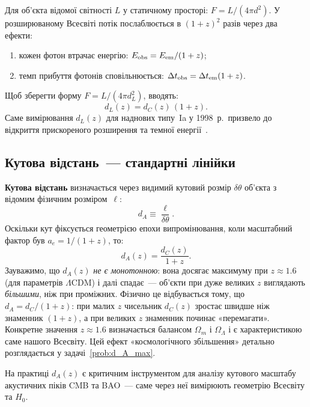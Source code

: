 Для об'єкта відомої світності $L$ у статичному просторі:
$F = L/(4\pi d^2)$. У розширюваному Всесвіті потік послаблюється
в $(1+z)^2$ разів через два ефекти:
\begin{enumerate}
  \item кожен фотон втрачає енергію: $E_{\rm obs} = E_{\rm em}/(1+z)$;
  \item темп прибуття фотонів сповільнюється: $\Delta t_{\rm obs}
        = \Delta t_{\rm em}(1+z)$.
\end{enumerate}
Щоб зберегти форму $F = L/(4\pi d_L^2)$, вводять:
\begin{equation}\label{eq:d_L}
  d_L(z) = d_C(z)\,(1+z).
\end{equation}
Саме вимірювання $d_L(z)$ для наднових типу~Ia у 1998~р.\ призвело
до відкриття прискореного розширення та темної
енергії~\cite{Perlmutter1999,Riess1998}.

\subsection*{Кутова відстань~--- стандартні лінійки}

\textbf{Кутова відстань} визначається через видимий кутовий розмір
$\delta\theta$ об'єкта з відомим фізичним розміром~$\ell$:
\begin{equation}\label{eq:d_A_def}
  d_A \equiv \frac{\ell}{\delta\theta}.
\end{equation}
Оскільки кут фіксується геометрією епохи випромінювання, коли
масштабний фактор був $a_e = 1/(1+z)$, то:
\begin{equation}\label{eq:d_A}
  d_A(z) = \frac{d_C(z)}{1+z}.
\end{equation}
Зауважимо, що $d_A(z)$ \emph{не є монотонною}: вона досягає
максимуму при $z \approx 1.6$ (для параметрів $\Lambda$CDM) і
далі спадає~--- об'єкти при дуже великих $z$ виглядають
\emph{більшими}, ніж при проміжних. Фізично це відбувається тому,
що $d_A = d_C/(1+z)$: при малих $z$ чисельник $d_C(z)$ зростає
швидше ніж знаменник $(1+z)$, а при великих $z$ знаменник починає
«перемагати». Конкретне значення $z \approx 1.6$ визначається
балансом $\Omega_m$ і $\Omega_\Lambda$ і є характеристикою
саме нашого Всесвіту.
Цей ефект «космологічного
збільшення» детально розглядається у задачі~\ref{prob:d_A_max}.

На практиці $d_A(z)$ є критичним інструментом для аналізу
кутового масштабу акустичних піків CMB та BAO~--- саме через неї
вимірюють геометрію Всесвіту та $H_0$.

